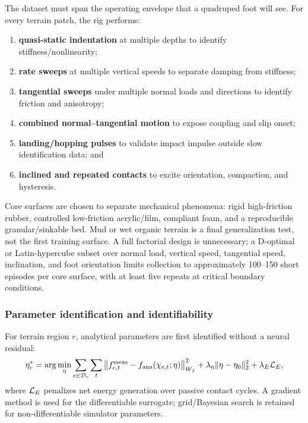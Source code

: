 The dataset must span the operating envelope that a quadruped foot will see. For every terrain patch, the rig performs:
\begin{enumerate}
  \item \textbf{quasi-static indentation} at multiple depths to identify stiffness/nonlinearity;
  \item \textbf{rate sweeps} at multiple vertical speeds to separate damping from stiffness;
  \item \textbf{tangential sweeps} under multiple normal loads and directions to identify friction and anisotropy;
  \item \textbf{combined normal--tangential motion} to expose coupling and slip onset;
  \item \textbf{landing/hopping pulses} to validate impact impulse outside slow identification data; and
  \item \textbf{inclined and repeated contacts} to excite orientation, compaction, and hysteresis.
\end{enumerate}

Core surfaces are chosen to separate mechanical phenomena: rigid high-friction rubber, controlled low-friction acrylic/film, compliant foam, and a reproducible granular/sinkable bed. Mud or wet organic terrain is a final generalization test, not the first training surface. A full factorial design is unnecessary; a D-optimal or Latin-hypercube subset over normal load, vertical speed, tangential speed, inclination, and foot orientation limits collection to approximately 100--150 short episodes per core surface, with at least five repeats at critical boundary conditions.

\subsubsection{Parameter identification and identifiability}

For terrain region $r$, analytical parameters are first identified without a neural residual:
\begin{equation}
\eta_r^*=\arg\min_{\eta}
\sum_{e\in\mathcal{D}_r}\sum_t
\left\lVert f_{e,t}^{\mathrm{meas}}-f_{\mathrm{ana}}(\chi_{e,t};\eta)\right\rVert_{W_f}^2
+\lambda_\eta\lVert\eta-\eta_0\rVert_2^2
+\lambda_E\mathcal{L}_E,
\label{eq:sysid}
\end{equation}
where $\mathcal{L}_E$ penalizes net energy generation over passive contact cycles. A gradient method is used for the differentiable surrogate; grid/Bayesian search is retained for non-differentiable simulator parameters.

